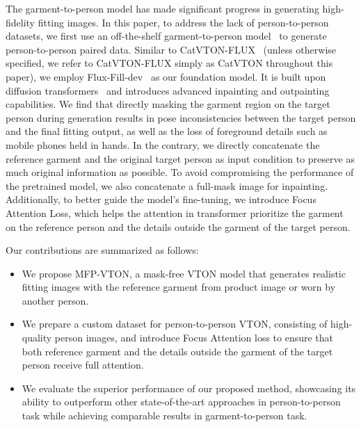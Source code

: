 The garment-to-person model has made significant progress in generating high-fidelity fitting images. In this paper, to address the lack of person-to-person datasets, we first use an off-the-shelf garment-to-person model~\cite{choi2024improving} to generate person-to-person paired data. Similar to CatVTON-FLUX~\cite{catvton-flux} (unless otherwise specified, we refer to CatVTON-FLUX simply as CatVTON throughout this paper), we employ Flux-Fill-dev~\cite{flux} as our foundation model. It is built upon diffusion transformers~\cite{peebles2023scalable, esser2024scaling} and introduces advanced inpainting and outpainting capabilities. We find that directly masking the garment region on the target person during generation results in pose inconsistencies between the target person and the final fitting output, as well as the loss of foreground details such as mobile phones held in hands. In the contrary, we directly concatenate the reference garment and the original target person as input condition to preserve as much original information as possible. To avoid compromising the performance of the pretrained model, we also concatenate a full-mask image for inpainting. Additionally, to better guide the model's fine-tuning, we introduce Focus Attention Loss, which helps the attention in transformer prioritize the garment on the reference person and the details outside the garment of the target person.

Our contributions are summarized as follows:
\begin{itemize}
    \item   We propose MFP-VTON, a mask-free VTON model that generates realistic fitting images with the reference garment from product image or worn by another person.
    \item	We prepare a custom dataset for person-to-person VTON, consisting of high-quality person images, and introduce Focus Attention loss to ensure that both reference garment and the details outside the garment of the target person receive full attention.
    \item	We evaluate the superior performance of our proposed method, showcasing its ability to outperform other state-of-the-art approaches in person-to-person task while achieving comparable results in garment-to-person task.
\end{itemize}




